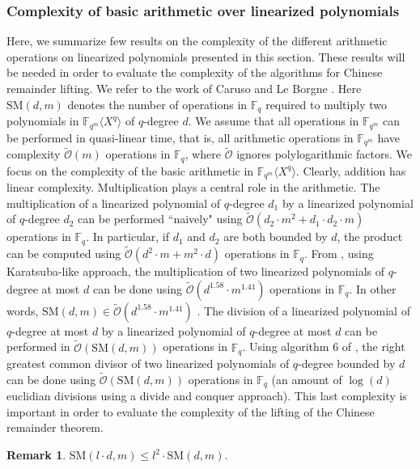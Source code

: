 \documentclass{article}
\newcommand{\Fq}{\mathbb{F}_q}
\newcommand{\Fqm}{\mathbb{F}_{q^m}}
\newcommand{\QP}{\mathbb{F}_{q^m} \langle X^q \rangle}
\newcommand{\SM}[2]{\text{SM}(#1,#2)}
\newcommand{\sO}{\tilde{\mathcal{O}}}
\theoremstyle{definition}
\newtheorem{remark}{Remark}
\begin{document}
\subsubsection{Complexity of basic arithmetic over linearized polynomials} \label{complex1}

Here, we  summarize few results on the complexity of the different arithmetic operations on linearized
polynomials presented in this section. These results will be needed in order to
evaluate the complexity of the algorithms for Chinese remainder lifting. We
refer to the work of Caruso and Le Borgne \cite{CARUSOLEBORGNE}. Here $\SM{d}{m}$ denotes the number of operations in
$\Fq$ required to multiply two polynomials in $\QP$ of $q$-degree $d$. We assume that all operations
in $\Fqm$ can be performed in quasi-linear time, that is, all arithmetic operations in $\Fqm$ have complexity
$\tilde{\mathcal{O}}(m)$ operations in $\Fq$, where $\tilde{\mathcal{O}}$ ignores
polylogarithmic factors. We focus on the complexity of the basic arithmetic in $\QP$.
Clearly, addition has linear complexity. Multiplication plays a central role in the arithmetic.
The multiplication of a linearized polynomial of $q$-degree $d_1$ by a linearized polynomial of $q$-degree $d_2$
can be performed ``naively" using $\sO(d_2\cdot m^2 +d_1\cdot d_2 \cdot m)$ operations in $\Fq$. In particular, if $d_1$ and
$d_2$ are both bounded by $d$, the product can be computed using
$\sO(d^2 \cdot m + m^2 \cdot d)$ operations in $\Fq$.  From \cite{CARUSOLEBORGNE}, using
Karatsuba-like approach, the multiplication of two linearized polynomials of $q$-degree at most $d$
can be done using $\sO(d^{1.58} \cdot m^{1.41})$ operations in $\Fq$. In other words,
$\SM{d}{m} \in \sO(d^{1.58} \cdot m^{1.41})$ . The division of a linearized
polynomial of $q$-degree at most $d$ by a linearized polynomial of $q$-degree at most $d$
can be performed in $\sO(\SM{d}{m})$ operations in $\Fq$. Using algorithm 6 of \cite{CARUSOLEBORGNE},
the right greatest common divisor of two linearized polynomials of $q$-degree bounded by $d$ can be done using
$\sO(\SM{d}{m})$  operations in $\Fq$ (an amount of $\log(d)$ euclidian divisions using a divide and conquer approach).
This last complexity is important in order to evaluate the complexity of the lifting of the Chinese remainder theorem.

\begin{remark} \label{remult}
      $\SM{l \cdot d}{m} \leq l^2 \cdot \SM{d}{m}$.
\end{remark}

\color{black}
\end{document}
